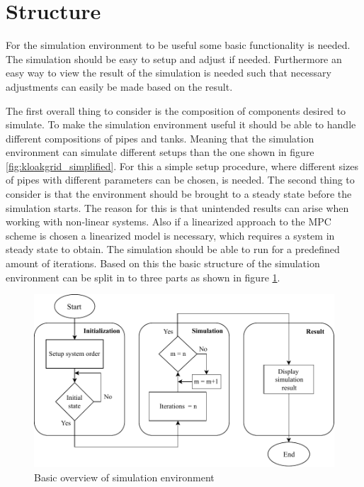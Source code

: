 \section{Structure}\label{sec:Structure}
For the simulation environment to be useful some basic functionality is needed. The simulation should be easy to setup and adjust if needed. 
Furthermore an easy way to view the result of the simulation is needed such that necessary adjustments can easily be made based on the result.

The first overall thing to consider is the composition of components desired to simulate. 
To make the simulation environment useful it should be able to handle different compositions of pipes and tanks. Meaning that the simulation environment can simulate different setups than the one shown in figure \ref{fig:kloakgrid_simplified}. For this a simple setup procedure, where different sizes of pipes with different parameters can be chosen, is needed. 
The second thing to consider is that the environment should be brought to a steady state before the simulation starts. The reason for this is that unintended results can arise when working with non-linear systems. Also if a linearized approach to the MPC scheme is chosen a linearized model is necessary, which requires a system in steady state to obtain. 
The simulation should be able to run for a predefined amount of iterations. 
Based on this the basic structure of the simulation environment can be split in to three parts as shown in figure \ref{fig:struct_overview}.

\begin{figure}[H]
\centering
\includegraphics[width=0.9 \textwidth]{report/simulation/pictures/struct_overview.pdf}
\caption{Basic overview of simulation environment}
\label{fig:struct_overview}
\end{figure}



